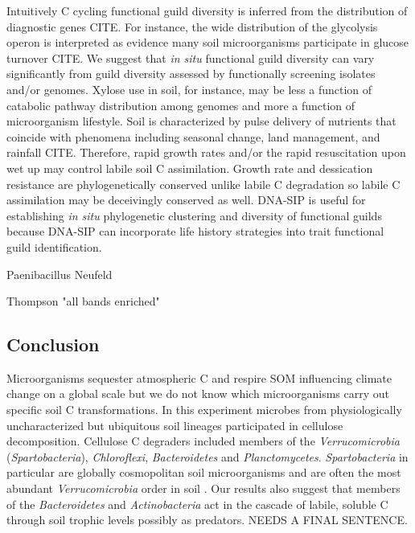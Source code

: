Intuitively C cycling functional guild diversity is inferred from the
distribution of diagnostic genes CITE. For instance, the wide distribution of
the glycolysis operon is interpreted as evidence many soil microorganisms
participate in glucose turnover CITE. We suggest that \textit{in situ}
functional guild diversity can vary significantly from guild diversity assessed
by functionally screening isolates and/or genomes. Xylose use in soil, for
instance, may be less a function of catabolic pathway distribution among
genomes and more a function of microorganism lifestyle. Soil is characterized
by pulse delivery of nutrients that coincide with phenomena including seasonal
change, land management, and rainfall CITE. Therefore, rapid growth rates
and/or the rapid resuscitation upon wet up may control labile soil
C assimilation. Growth rate and dessication resistance are phylogenetically
conserved unlike labile C degradation so labile C assimilation may be
deceivingly conserved as well. DNA-SIP is useful for establishing \textit{in
situ} phylogenetic clustering and diversity of functional guilds because
DNA-SIP can incorporate life history strategies into trait functional guild
identification.

Paenibacillus Neufeld

Thompson "all bands enriched"

\subsection{Conclusion} 
Microorganisms sequester atmospheric C and respire SOM influencing climate
change on a global scale but we do not know which microorganisms carry out
specific soil C transformations. In this experiment microbes from
physiologically uncharacterized but ubiquitous soil lineages participated in
cellulose decomposition. Cellulose C degraders included members of the
\textit{Verrucomicrobia} (\textit{Spartobacteria}), \textit{Chloroflexi},
\textit{Bacteroidetes} and \textit{Planctomycetes}. \textit{Spartobacteria} in
particular are globally cosmopolitan soil microorganisms and are often the most
abundant \textit{Verrucomicrobia} order in soil \citep{Bergmann_2011}. Our
results also suggest that members of the \textit{Bacteroidetes} and
\textit{Actinobacteria} act in the cascade of labile, soluble C through soil
trophic levels possibly as predators. NEEDS A FINAL SENTENCE.

